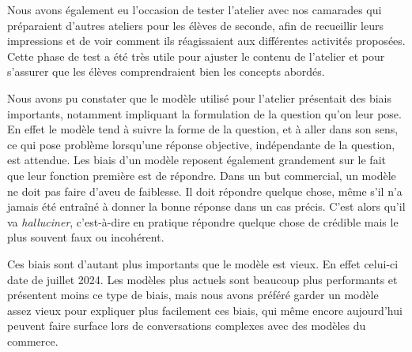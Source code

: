   Nous avons également eu l'occasion de tester l'atelier avec nos camarades qui préparaient d'autres ateliers pour les élèves de seconde, afin de recueillir leurs impressions et de voir comment ils réagissaient aux différentes activités proposées. Cette phase de test a été très utile pour ajuster le contenu de l'atelier et pour s'assurer que les élèves comprendraient bien les concepts abordés. \par 
Nous avons pu constater que le modèle utilisé pour l'atelier présentait des biais importants, notamment impliquant la formulation de la question qu'on leur pose. En effet le modèle tend à suivre la forme de la question, et à aller dans son sens, ce qui pose problème lorsqu'une réponse objective, indépendante de la question, est attendue. Les biais d'un modèle reposent également grandement sur le fait que leur fonction première est de répondre. Dans un but commercial, un modèle ne doit pas faire d'aveu de faiblesse. Il doit répondre quelque chose, même s'il n'a jamais été entraîné à donner la bonne réponse dans un cas précis. C'est alors qu'il va \textit{halluciner}, c'est-à-dire en pratique répondre quelque chose de crédible mais le plus souvent faux ou incohérent. \par
Ces biais sont d'autant plus importants que le modèle est vieux. En effet celui-ci date de juillet 2024. Les modèles plus actuels sont beaucoup plus performants et présentent moins ce type de biais, mais nous avons préféré garder un modèle assez vieux pour expliquer plus facilement ces biais, qui même encore aujourd'hui peuvent faire surface lors de conversations complexes avec des modèles du commerce.\par



